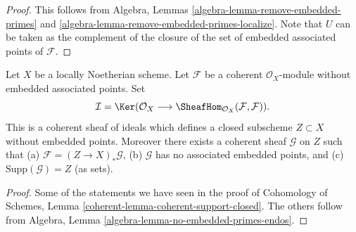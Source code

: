 \begin{proof}
This follows from
Algebra, Lemmas \ref{algebra-lemma-remove-embedded-primes} and
\ref{algebra-lemma-remove-embedded-primes-localize}.
Note that $U$ can be taken as the complement of the closure
of the set of embedded associated points of $\mathcal{F}$.
\end{proof}

\begin{lemma}
\label{lemma-no-embedded-points-endos}
Let $X$ be a locally Noetherian scheme.
Let $\mathcal{F}$ be a coherent $\mathcal{O}_X$-module
without embedded associated points. Set
$$
\mathcal{I}
=
\Ker(\mathcal{O}_X
\longrightarrow
\SheafHom_{\mathcal{O}_X}(\mathcal{F}, \mathcal{F})).
$$
This is a coherent sheaf of ideals which defines a closed
subscheme $Z \subset X$ without embedded points. Moreover
there exists a coherent sheaf $\mathcal{G}$ on $Z$
such that (a) $\mathcal{F} = (Z \to X)_*\mathcal{G}$,
(b) $\mathcal{G}$ has no associated embedded points, and
(c) $\text{Supp}(\mathcal{G}) = Z$ (as sets).
\end{lemma}

\begin{proof}
Some of the statements we have seen in the proof of
Cohomology of Schemes, Lemma \ref{coherent-lemma-coherent-support-closed}.
The others follow from
Algebra, Lemma \ref{algebra-lemma-no-embedded-primes-endos}.
\end{proof}



